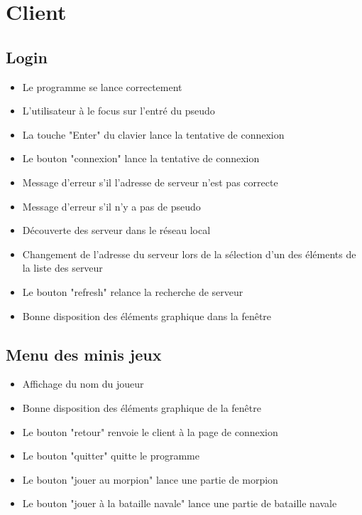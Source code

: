 \documentclass{report}
\begin{document}
\section{Client}
\subsection{Login}
\begin{itemize}
  \item Le programme se lance correctement
  \item L'utilisateur à le focus sur l'entré du pseudo
  \item La touche "Enter" du clavier lance la tentative de connexion
  \item Le bouton "connexion" lance la tentative de connexion
  \item Message d'erreur s'il l'adresse de  serveur n'est pas correcte
  \item Message d'erreur s'il n'y a pas de pseudo
  \item Découverte des serveur dans le réseau local
  \item Changement de l'adresse du serveur lors de la sélection d'un des éléments de la liste des serveur
  \item Le bouton "refresh" relance la recherche de serveur
  \item Bonne disposition des éléments graphique dans la fenêtre

\end{itemize}

\subsection{Menu des minis jeux}
\begin{itemize}
  \item Affichage du nom du joueur
  \item Bonne disposition des éléments graphique de la fenêtre
  \item Le bouton "retour" renvoie le client à la page de connexion
  \item Le bouton "quitter" quitte le programme
  \item Le bouton "jouer au morpion" lance une partie de morpion
  \item Le bouton "jouer à la bataille navale" lance une partie de bataille navale
\end{itemize}
\end{document}

